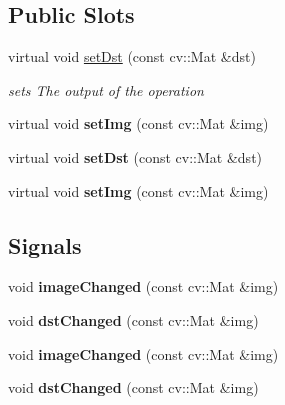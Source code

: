 \subsection*{Public Slots}
\begin{DoxyCompactItemize}
\item 
virtual void \hyperlink{class_image_processor_1_1_abstract_image_processor_a8d9dcbea1b426f4accdd8fcc650eb6ab}{set\+Dst} (const cv\+::\+Mat \&dst)
\begin{DoxyCompactList}\small\item\em sets The output of the operation \end{DoxyCompactList}\item 
\mbox{\label{class_image_processor_1_1_abstract_image_processor_a08c1e75c34cb5724e8b3ed4e55d90fb9}} 
virtual void {\bfseries set\+Img} (const cv\+::\+Mat \&img)
\item 
\mbox{\label{class_image_processor_1_1_abstract_image_processor_ac3cb6442277dc17f1cf2f2215c2cdab2}} 
virtual void {\bfseries set\+Dst} (const cv\+::\+Mat \&dst)
\item 
\mbox{\label{class_image_processor_1_1_abstract_image_processor_a240c3eec8500e5d2432b27a7b68b55b2}} 
virtual void {\bfseries set\+Img} (const cv\+::\+Mat \&img)
\end{DoxyCompactItemize}
\subsection*{Signals}
\begin{DoxyCompactItemize}
\item 
\mbox{\label{class_image_processor_1_1_abstract_image_processor_a5a252ccaca15ae5609bf490dff410a44}} 
void {\bfseries image\+Changed} (const cv\+::\+Mat \&img)
\item 
\mbox{\label{class_image_processor_1_1_abstract_image_processor_a98d198ad26991ee5fa200d8a1a740448}} 
void {\bfseries dst\+Changed} (const cv\+::\+Mat \&img)
\item 
\mbox{\label{class_image_processor_1_1_abstract_image_processor_a5a252ccaca15ae5609bf490dff410a44}} 
void {\bfseries image\+Changed} (const cv\+::\+Mat \&img)
\item 
\mbox{\label{class_image_processor_1_1_abstract_image_processor_a98d198ad26991ee5fa200d8a1a740448}} 
void {\bfseries dst\+Changed} (const cv\+::\+Mat \&img)
\end{DoxyCompactItemize}
